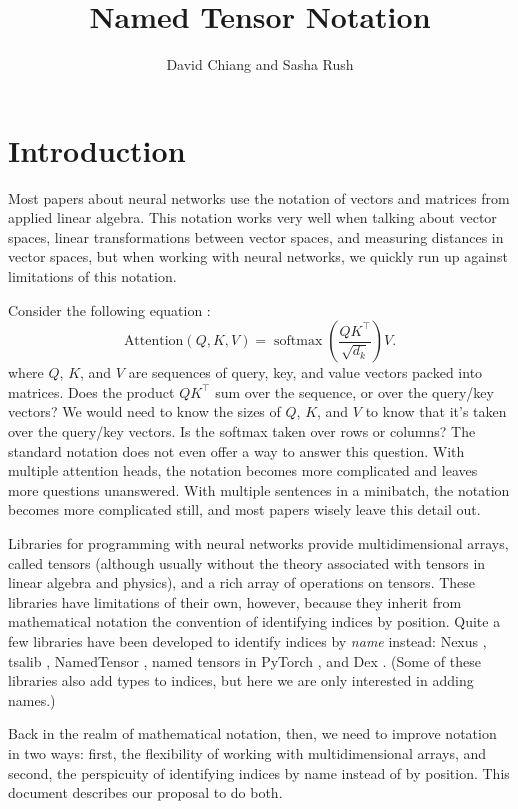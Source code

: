 \documentclass{article}
\title{Named Tensor Notation}
\author{David Chiang and Sasha Rush}
\DeclareMathOperator*{\softmax}{softmax}
\begin{document}
\maketitle

\tableofcontents

\section{Introduction}

Most papers about neural networks use the notation of vectors and matrices from applied linear algebra. This notation works very well when talking about vector spaces, linear transformations between vector spaces, and measuring distances in vector spaces, but when working with neural networks, we quickly run up against limitations of this notation.

Consider the following equation \citep{vaswani+:2017}:
\[ \text{Attention}(Q, K, V) = \softmax \left( \frac{QK^\top}{\sqrt{d_k}} \right) V. \]
where $Q$, $K$, and $V$ are sequences of query, key, and value vectors packed into matrices. Does the product $QK^\top$ sum over the sequence, or over the query/key vectors? We would need to know the sizes of $Q$, $K$, and $V$ to know that it's taken over the query/key vectors. Is the softmax taken over rows or columns? The standard notation does not even offer a way to answer this question. With multiple attention heads, the notation becomes more complicated and leaves more questions unanswered. With multiple sentences in a minibatch, the notation becomes more complicated still, and most papers wisely leave this detail out.

Libraries for programming with neural networks \citep{numpy,pytorch} provide multidimensional arrays, called tensors (although usually without the theory associated with tensors in linear algebra and physics), and a rich array of operations on tensors. These libraries have limitations of their own, however, because they inherit from mathematical notation the convention of identifying indices by position. Quite a few libraries have been developed to identify indices by \emph{name} instead: Nexus \citep{chen2017typesafe}, tsalib \citep{tsalib}, NamedTensor \citep{namedtensor}, named tensors in PyTorch \citep{named-tensors}, and Dex \citep{maclaurin+:2019}. (Some of these libraries also add types to indices, but here we are only interested in adding names.)

Back in the realm of mathematical notation, then, we need to improve notation in two ways: first, the flexibility of working with multidimensional arrays, and second, the perspicuity of identifying indices by name instead of by position. This document describes our proposal to do both.
\end{document}
